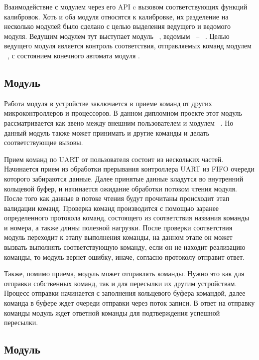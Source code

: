 Взаимодействие с модулем \moduleCalib через его API c вызовом соответствующих функций калибровок. Хоть и оба модуля относятся к калибровке,
их разделение на несколько модулей было сделано с целью выделения ведущего и ведомого модуля. Ведущим модулем тут выступает модуль \moduleCalibControl~, 
ведомым ~-- \moduleCalib~. Целью ведущего модуля является контроль соответствия, отправляемых команд модулем \moduleUart~, с состоянием конечного 
автомата модуля \moduleCalib. 


\subsection{Модуль \moduleUart}

Работа модуля в устройстве заключается в приеме команд от других микроконтроллеров и процессоров. В данном дипломном проекте
этот модуль рассматривается как звено между внешним пользователем и модулем \moduleCalib~. Но данный модуль также может принимать
и другие команды и делать соответствующие вызовы. 

Прием команд по UART от пользователя состоит из нескольких частей. Начинается прием из обработки прерывания контроллера UART из 
FIFO очереди которого забираются данные. Далее принятые данные кладутся во внутренний кольцевой буфер, и начинается ожидание обработки
потоком чтения модуля. После того как данные в потоке чтения будут прочитаны происходит этап валидации команд. 
Проверка команд производится с помощью заранее определенного протокола команд, состоящего из соответствия названия команды и номера, 
а также длины полезной нагрузки. После проверки соответствия модуль переходит к этапу выполнения команды, на данном этапе он может вызвать
выполнять соответствующую команду, если он не находит реализацию команды, то модуль вернет ошибку, иначе, согласно протоколу отправит ответ.

Также, помимо приема, модуль может отправлять команды. Нужно это как для отправки собственных команд, так и для пересылки их другим устройствам.
Процесс отправки начинается с заполнения кольцевого буфера командой, далее команда в буфере ждет очереди отправки через поток записи. В ответ на отправку
команды модуль ждет ответной команды для подтверждения успешной пересылки.


\subsection{Модуль \moduleMoveDetect}

